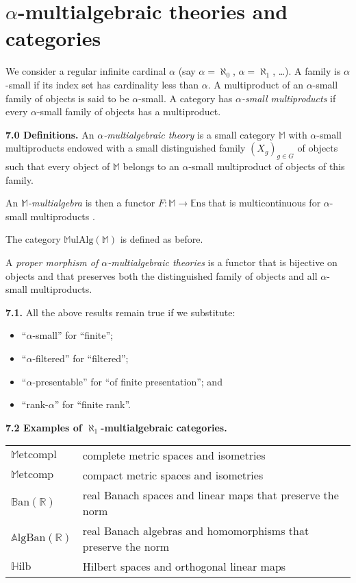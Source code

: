 \documentclass{article}
\newenvironment{rmenv}[1]
  {\phantomsection\par\medskip\noindent\textbf{#1.}\rmfamily}
  {\par\medskip}
\newcommand{\bb}[1]{{\mathbb{#1}}}
\newcommand{\Set}{\mathbb{E}\mathrm{ns}}
\newcommand{\MulAlg}{\mathbb{M}\mathrm{ulAlg}}
\newcommand{\oldpage}[1]{\marginpar{\footnotesize$\Big\vert$ \textit{p.~#1}}}
\begin{document}
\section{\texorpdfstring{$\alpha$}{alpha}-multialgebraic theories and categories}
\label{7}

We consider a regular infinite cardinal $\alpha$ (say $\alpha=\aleph_0$, $\alpha=\aleph_1$, \ldots).
A family is $\alpha$-small if its index set has cardinality less than $\alpha$.
A multiproduct of an $\alpha$-small family of objects is said to be $\alpha$-small.
A category has \emph{$\alpha$-small multiproducts} if every $\alpha$-small family of objects has a multiproduct.

\begin{rmenv}{7.0 Definitions}
\label{7.0}
  An \emph{$\alpha$-multialgebraic theory} is a small category $\bb{M}$ with $\alpha$-small multiproducts endowed with a small distinguished family $(X_g)_{g\in G}$ of objects such that every object of $\bb{M}$ belongs to an $\alpha$-small multiproduct of objects of this family.

  An \emph{$\bb{M}$-multialgebra} is then a functor $F\colon\bb{M}\to\Set$ that is multicontinuous for $\alpha$-small multiproducts \cite{2}.

  The category $\MulAlg(\bb{M})$ is defined as before.

  A \emph{proper morphism of $\alpha$-multialgebraic theories} is a functor that is bijective on objects and that preserves both the distinguished family of objects and all $\alpha$-small multiproducts.
\end{rmenv}

\oldpage{209}
\begin{rmenv}{7.1}
  All the above results remain true if we substitute:
  \begin{itemize}
    \item ``$\alpha$-small'' for ``finite'';
    \item ``$\alpha$-filtered'' for ``filtered'';
    \item ``$\alpha$-presentable'' for ``of finite presentation''; and
    \item ``rank-$\alpha$'' for ``finite rank''.
  \end{itemize}
\end{rmenv}

\begin{rmenv}{7.2 Examples of $\aleph_1$-multialgebraic categories}
  \begin{longtable}{p{0.6in}p{4.4in}}
    $\bb{M}\mathrm{etcompl}$ & complete metric spaces and isometries
  \\$\bb{M}\mathrm{etcomp}$ & compact metric spaces and isometries
  \\$\bb{B}\mathrm{an}(\bb{R})$ & real Banach spaces and linear maps that preserve the norm
  \\$\bb{A}\mathrm{lgBan}(\bb{R})$ & real Banach algebras and homomorphisms that preserve the norm
  \\$\bb{H}\mathrm{ilb}$ & Hilbert spaces and orthogonal linear maps
  \end{longtable}
\end{rmenv}
\end{document}
